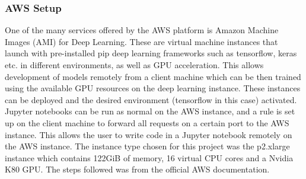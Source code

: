 \documentclass[12pt]{report}
\begin{document}
\subsubsection{AWS Setup}
\begin{flushleft}
One of the many services offered by the AWS platform is Amazon Machine Images (AMI) for Deep Learning. These are virtual machine instances that launch with pre-installed pip deep learning frameworks such as tensorflow, keras etc. in different environments, as well as GPU acceleration. This allows development of models remotely from a client machine which can be then trained using the available GPU resources on the deep learning instance. These instances can be deployed and the desired environment (tensorflow in this case) activated. Jupyter notebooks can be run as normal on the AWS instance, and a rule is set up on the client machine to forward all requests on a certain port to the AWS instance. This allows the user to write code in a Jupyter notebook remotely on the AWS instance. The instance type chosen for this project was the p2.xlarge instance which contains 122GiB of memory, 16 virtual CPU cores and a Nvidia K80 GPU. The steps followed was from the official AWS documentation.
\end{flushleft}
\end{document}
